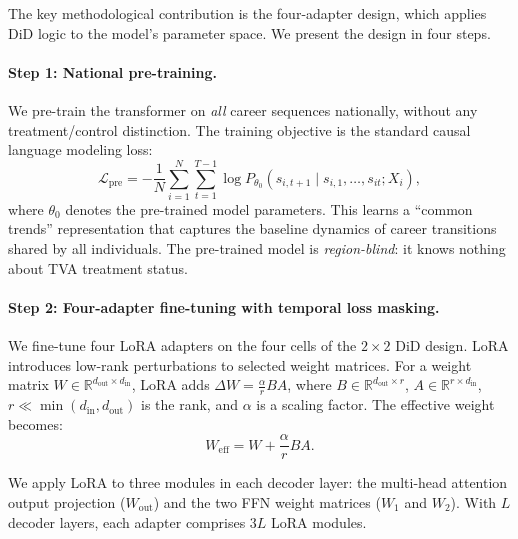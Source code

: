 \documentclass[12pt]{article}
\newcommand{\RR}{\mathbb{R}}
\begin{document}
The key methodological contribution is the four-adapter design, which applies DiD logic to the model's parameter space. We present the design in four steps.

\paragraph{Step 1: National pre-training.} We pre-train the transformer on \textit{all} career sequences nationally, without any treatment/control distinction. The training objective is the standard causal language modeling loss:
\begin{equation}\label{eq:pretrain_loss}
\mathcal{L}_{\text{pre}} = -\frac{1}{N} \sum_{i=1}^{N} \sum_{t=1}^{T-1} \log P_{\theta_0}(s_{i,t+1} \mid s_{i,1}, \ldots, s_{it}; X_i),
\end{equation}
where $\theta_0$ denotes the pre-trained model parameters. This learns a ``common trends'' representation that captures the baseline dynamics of career transitions shared by all individuals. The pre-trained model is \textit{region-blind}: it knows nothing about TVA treatment status.

\paragraph{Step 2: Four-adapter fine-tuning with temporal loss masking.} We fine-tune four LoRA adapters \citep{hu2022lora} on the four cells of the $2 \times 2$ DiD design. LoRA introduces low-rank perturbations to selected weight matrices. For a weight matrix $W \in \RR^{d_{\text{out}} \times d_{\text{in}}}$, LoRA adds $\Delta W = \frac{\alpha}{r} BA$, where $B \in \RR^{d_{\text{out}} \times r}$, $A \in \RR^{r \times d_{\text{in}}}$, $r \ll \min(d_{\text{in}}, d_{\text{out}})$ is the rank, and $\alpha$ is a scaling factor. The effective weight becomes:
\begin{equation}\label{eq:lora}
W_{\text{eff}} = W + \frac{\alpha}{r} BA.
\end{equation}

We apply LoRA to three modules in each decoder layer: the multi-head attention output projection ($W_{\text{out}}$) and the two FFN weight matrices ($W_1$ and $W_2$). With $L$ decoder layers, each adapter comprises $3L$ LoRA modules.
\end{document}
